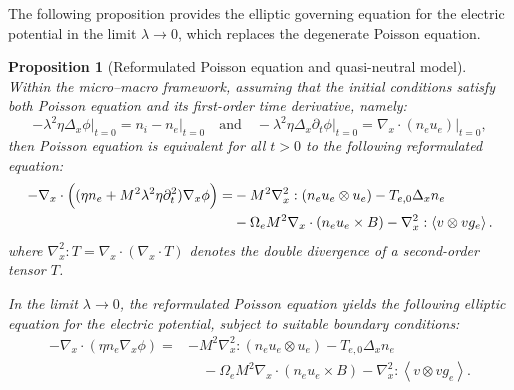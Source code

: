 \documentclass[pdflatex,final,10pt]{article}
\newtheorem{proposition}{Proposition}[section]
\newcommand{\Fabrice}[1]{#1}
\begin{document}
The following proposition provides the elliptic governing equation for the electric potential in the limit $\lambda\to0$, which replaces the degenerate Poisson equation.



\begin{proposition}[Reformulated Poisson equation and quasi-neutral model] \label{prop2.2}
Within the micro--macro framework, assuming that the initial conditions satisfy both Poisson equation and its first-order time derivative, namely:
\begin{equation} \label{eq:init_cond}
    -\lambda^2\eta\Delta_x\phi\vert_{t=0} = n_i - n_e\vert_{t=0} \quad \text{and} \quad -\lambda^2\eta\Delta_x\partial_t\phi\vert_{t=0} = \nabla_x\cdot(n_e u_e)\vert_{t=0},
\end{equation}
then Poisson equation is equivalent for all $t > 0$ to the following reformulated equation:
\begin{align} \label{eq:poisson_reformulated}
    -\nabla_x\cdot\Big((\Fabrice{\eta}n_e+M^2\lambda^2\eta\partial_t^2)\nabla_x\phi\Big) = &- M^2\nabla_x^2:(n_eu_e\otimes u_e)-T_{e,0}\Fabrice{\Delta_x}n_e \\ &\Fabrice{ - \Omega_e M^2 \nabla_x \cdot (n_e u_e \times B )} - \nabla_x^2:\left< v\otimes vg_e \right>. \notag
\end{align}
where $\nabla_x^2 : T = \nabla_x \cdot (\nabla_x \cdot T)$ denotes the double divergence of a second-order tensor $T$.

In the limit $\lambda\to0$, the reformulated Poisson equation yields the following elliptic equation for the electric potential, subject to suitable boundary conditions:
\begin{align*}
    -\nabla_x\cdot(\Fabrice{\eta}n_e\nabla_x\phi) = &- M^2\nabla_x^2:(n_eu_e\otimes u_e)-T_{e,0}\Fabrice{\Delta_x}n_e \\
   &\quad \Fabrice{ - \Omega_e M^2 \nabla_x \cdot (n_e u_e \times B )} - \nabla_x^2:\left< v\otimes vg_e \right>.
\end{align*}
\end{proposition}
\end{document}
